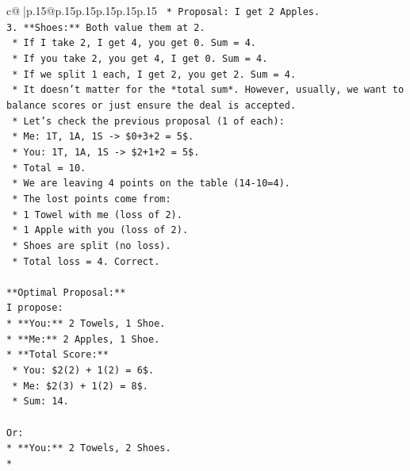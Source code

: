 \documentclass{article}
\begin{document}
{\begin{supertabular}{c@{$\;$}|p{.15\linewidth}@{}p{.15\linewidth}p{.15\linewidth}p{.15\linewidth}p{.15\linewidth}p{.15\linewidth}}
{{{\texttt{    *   Proposal: I get 2 Apples.} \\
\texttt{3.  **Shoes:** Both value them at 2.} \\
\texttt{    *   If I take 2, I get 4, you get 0. Sum = 4.} \\
\texttt{    *   If you take 2, you get 4, I get 0. Sum = 4.} \\
\texttt{    *   If we split 1 each, I get 2, you get 2. Sum = 4.} \\
\texttt{    *   It doesn't matter for the *total sum*. However, usually, we want to balance scores or just ensure the deal is accepted.} \\
\texttt{    *   Let's check the previous proposal (1 of each):} \\
\texttt{        *   Me: 1T, 1A, 1S {-}> \$0+3+2 = 5\$.} \\
\texttt{        *   You: 1T, 1A, 1S {-}> \$2+1+2 = 5\$.} \\
\texttt{        *   Total = 10.} \\
\texttt{        *   We are leaving 4 points on the table (14{-}10=4).} \\
\texttt{        *   The lost points come from:} \\
\texttt{            *   1 Towel with me (loss of 2).} \\
\texttt{            *   1 Apple with you (loss of 2).} \\
\texttt{            *   Shoes are split (no loss).} \\
\texttt{            *   Total loss = 4. Correct.} \\
\\ 
\texttt{**Optimal Proposal:**} \\
\texttt{I propose:} \\
\texttt{*   **You:** 2 Towels, 1 Shoe.} \\
\texttt{*   **Me:** 2 Apples, 1 Shoe.} \\
\texttt{*   **Total Score:**} \\
\texttt{    *   You: \$2(2) + 1(2) = 6\$.} \\
\texttt{    *   Me: \$2(3) + 1(2) = 8\$.} \\
\texttt{    *   Sum: 14.} \\
\\ 
\texttt{Or:} \\
\texttt{*   **You:** 2 Towels, 2 Shoes.} \\
\texttt{*} \\
            }
        }
    }
     \\ \\


\end{supertabular}}
\end{document}
